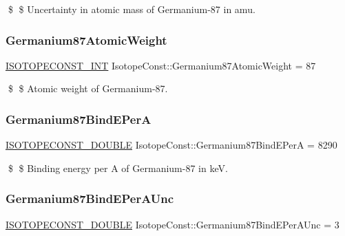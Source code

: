 \$ \$ Uncertainty in atomic mass of Germanium-\/87 in amu. \mbox{\label{group___isotope_const-_germanium-_ge87_gadecbfae820f66e68193ee83389fe31a8}} 
\subsubsection{\texorpdfstring{Germanium87\+Atomic\+Weight}{Germanium87AtomicWeight}}
{\footnotesize\ttfamily \mbox{\hyperlink{group___isotope_const-_macros_ga5f18360b3e99483a35c32d789e62621c}{I\+S\+O\+T\+O\+P\+E\+C\+O\+N\+S\+T\+\_\+\+I\+NT}} Isotope\+Const\+::\+Germanium87\+Atomic\+Weight = 87}

\$ \$ Atomic weight of Germanium-\/87. \mbox{\label{group___isotope_const-_germanium-_ge87_ga19849998dacbc97cd3835b031c104262}} 
\subsubsection{\texorpdfstring{Germanium87\+Bind\+E\+PerA}{Germanium87BindEPerA}}
{\footnotesize\ttfamily \mbox{\hyperlink{group___isotope_const-_macros_ga8f45a7272ce02c0b4c65c44636ed719a}{I\+S\+O\+T\+O\+P\+E\+C\+O\+N\+S\+T\+\_\+\+D\+O\+U\+B\+LE}} Isotope\+Const\+::\+Germanium87\+Bind\+E\+PerA = 8290}

\$ \$ Binding energy per A of Germanium-\/87 in keV. \mbox{\label{group___isotope_const-_germanium-_ge87_ga4f84bc8ff5f63cef80b4dd3301b40d91}} 
\subsubsection{\texorpdfstring{Germanium87\+Bind\+E\+Per\+A\+Unc}{Germanium87BindEPerAUnc}}
{\footnotesize\ttfamily \mbox{\hyperlink{group___isotope_const-_macros_ga8f45a7272ce02c0b4c65c44636ed719a}{I\+S\+O\+T\+O\+P\+E\+C\+O\+N\+S\+T\+\_\+\+D\+O\+U\+B\+LE}} Isotope\+Const\+::\+Germanium87\+Bind\+E\+Per\+A\+Unc = 3}

